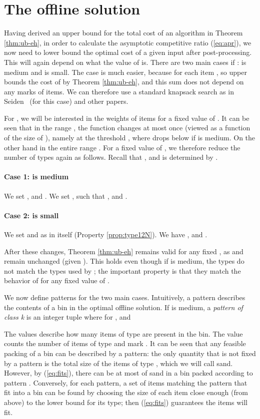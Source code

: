 \section{The offline solution} \label{sec:offline-solution}
Having derived an upper bound for the total cost of an \EHarm{} algorithm
in Theorem \ref{thm:ub-eh}, in order to calculate the asymptotic competitive
ratio (\ref{eq:apr}), we now need to lower bound the optimal cost of a given input
after post-processing. This will again depend on what the value of  is.
There are two main cases if : { is medium and  is small}.
The case  is much easier, because  for each item ,
so 
upper bounds the cost of  by Theorem \ref{thm:ub-eh}, 
and this sum does not depend on any marks of items.
We can therefore use a standard knapsack search
as in Seiden~\cite{Seiden02} (for this case) and other papers.

For , we will be interested in the weights of items for a fixed value of .
It can be seen that in the range , the function  changes at most once
(viewed as a function of the size of ), namely at the threshold ,
where  drops below  if  is medium.
On the other hand  in the entire range .
For a fixed value of , we therefore reduce the number of types again as follows. 
Recall that , and  is determined by .

\paragraph{Case 1:  is medium}
We set ,  and . We set , 
 such that , and .

\paragraph{Case 2:  is small}
We set  and  as in {\EHarm} itself (Property \ref{prop:type12N}).
We have , and .

\vspace{10pt}
After these changes, Theorem \ref{thm:ub-eh} remains valid for any fixed , as  and  remain
unchanged (given ).
This holds even though if  is medium, the types do not match the types used by {\EHarm};
the important property is that they match the behavior of {\EHarm} for any fixed value of .


We now define patterns for the two main cases.
Intuitively, a pattern describes the contents of a bin in the optimal offline solution. 
If  is medium, a \emph{pattern of class k} is an integer tuple  where  for , 
and

The values  describe how many items of type  are present in the bin.
The value  counts the number of items of type  and mark . 
It can be seen that any feasible packing of a bin can be described by a pattern: the only quantity that is not 
fixed by a pattern is the total size of the items of type , which we will call sand.
However, by (\ref{eq:fits}), there can be at most  of sand in a bin
packed according to pattern . Conversely, for each pattern, a set of items matching the pattern
that fit into a bin can be found by choosing the size of each item close enough (from above) to the
lower bound  for its type; then (\ref{eq:fits}) guarantees the items will fit.

